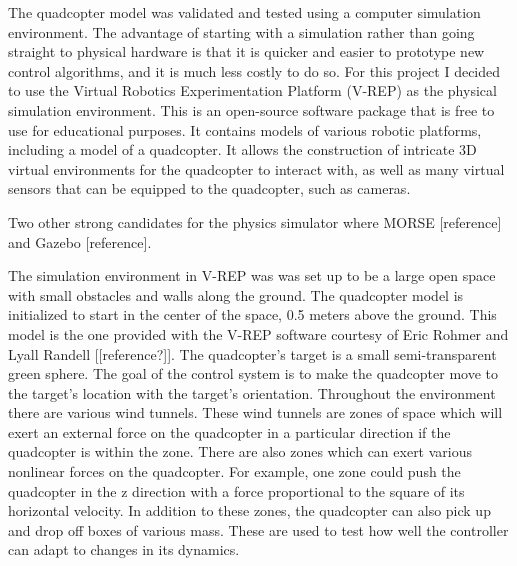 \documentclass[letterpaper,12pt,titlepage,oneside,final]{book}
\begin{document}

The quadcopter model was validated and tested using a computer simulation environment. 
The advantage of starting with a simulation rather than going straight to physical hardware is that it is quicker and easier to prototype new control algorithms, and it is much less costly to do so. 
For this project I decided to use the Virtual Robotics Experimentation Platform (V-REP)\cite{vrep} as the physical simulation environment.
This is an open-source software package that is free to use for educational purposes. 
It contains models of various robotic platforms, including a model of a quadcopter. 
It allows the construction of intricate 3D virtual environments for the quadcopter to interact with, as well as many virtual sensors that can be equipped to the quadcopter, such as cameras.

Two other strong candidates for the physics simulator where MORSE [reference] and Gazebo [reference]. 


The simulation environment in V-REP was was set up to be a large open space with small obstacles and walls along the ground. 
The quadcopter model is initialized to start in the center of the space, 0.5 meters above the ground. 
This model is the one provided with the V-REP software courtesy of Eric Rohmer and Lyall Randell [[reference?]]. 
The quadcopter’s target is a small semi-transparent green sphere. The goal of the control system is to make the quadcopter move to the target’s location with the target’s orientation. 
Throughout the environment there are various wind tunnels. 
These wind tunnels are zones of space which will exert an external force on the quadcopter in a particular direction if the quadcopter is within the zone. 
There are also zones which can exert various nonlinear forces on the quadcopter. 
For example, one zone could push the quadcopter in the z direction with a force proportional to the square of its horizontal velocity. 
In addition to these zones, the quadcopter can also pick up and drop off boxes of various mass. 
These are used to test how well the controller can adapt to changes in its dynamics.
\end{document}
